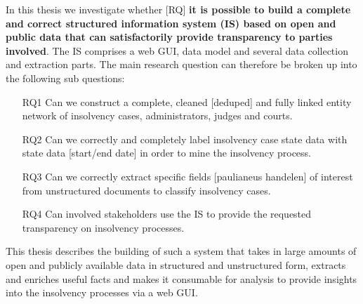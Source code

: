 In this thesis we investigate whether [RQ] \textbf{it is possible to build a complete and correct structured information system (IS) based on open and public data that can satisfactorily provide transparency to parties involved}. The IS comprises a web GUI, data model and several data collection and extraction parts. The main research question can therefore be broken up into the following sub questions:
\begin{itemize}
	\item [RQ1] Can we construct a complete, cleaned [deduped] and fully linked entity network of insolvency cases, administrators, judges and courts.
	\item [RQ2] Can we correctly and completely label insolvency case state data with state data [start/end date] in order to mine the insolvency process.
	\item [RQ3] Can we correctly extract specific fields [paulianeus handelen] of interest from unstructured documents to classify insolvency cases.
	\item [RQ4] Can involved stakeholders use the IS to provide the requested transparency on insolvency processes.
\end{itemize}

This thesis describes the building of such a system that takes in large amounts of open and publicly available data in structured and unstructured form, extracts and enriches useful facts and makes it consumable for analysis to provide insights into the insolvency processes via a web GUI.
